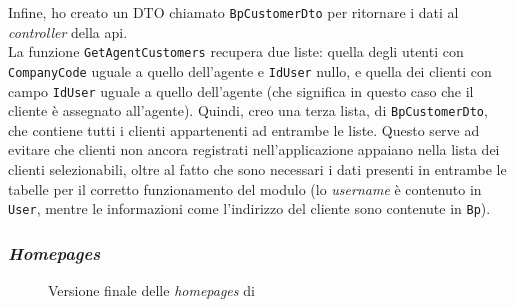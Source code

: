 Infine, ho creato un DTO chiamato \texttt{BpCustomerDto} per ritornare i dati al \textit{controller} della \gls{api}.\\
La funzione \texttt{GetAgentCustomers} recupera due liste: quella degli utenti con \texttt{CompanyCode} uguale a quello dell'agente 
e \texttt{IdUser} nullo, e quella dei clienti con campo \texttt{IdUser} uguale a quello dell'agente (che significa in questo caso 
che il cliente è assegnato all'agente). Quindi, creo una terza lista, di \texttt{BpCustomerDto}, che contiene tutti i clienti 
appartenenti ad entrambe le liste. Questo serve ad evitare che clienti non ancora registrati nell'applicazione appaiano nella lista 
dei clienti selezionabili, oltre al fatto che sono necessari i dati presenti in entrambe le tabelle per il corretto funzionamento del modulo 
(lo \textit{username} è contenuto in \texttt{User}, mentre le informazioni come l'indirizzo del cliente sono contenute in \texttt{Bp}).

\subsubsection{\textit{Homepages}}

\begin{figure}[H]
    \centering
    \hfill
    \caption{Versione finale delle \textit{homepages} di {\movi}}
    \label{fig:MVOR homepages}
\end{figure}

